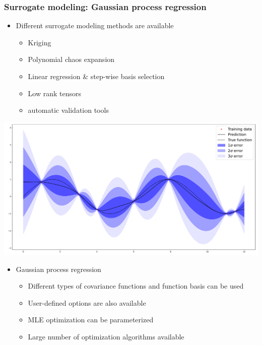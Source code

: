 \documentclass{beamer}
\begin{document}




\begin{frame}[containsverbatim]
\frametitle{Surrogate modeling: Gaussian process regression}

\begin{minipage}[t]{0.5\textwidth}
    
\small 
\begin{itemize}
\item Different surrogate modeling methods are available
\begin{itemize}
\tiny
\item Kriging
\item Polynomial chaos expansion
\item Linear regression \& step-wise basis selection
\item Low rank tensors
\item automatic validation tools
\end{itemize}
\end{itemize}



    
\centering
    \includegraphics[width=.9\textwidth]{figures/Kriging.pdf}
    
\end{minipage}%
\begin{minipage}[t]{0.5\textwidth}
    
\small
\begin{itemize}
\item Gaussian process regression
\begin{itemize}
\tiny
\item Different types of covariance functions and function basis can be used
\item User-defined options are also available
\item MLE optimization can be parameterized
\item Large number of optimization algorithms available
\end{itemize}
\end{itemize}



\end{minipage}
\end{frame}
\end{document}
